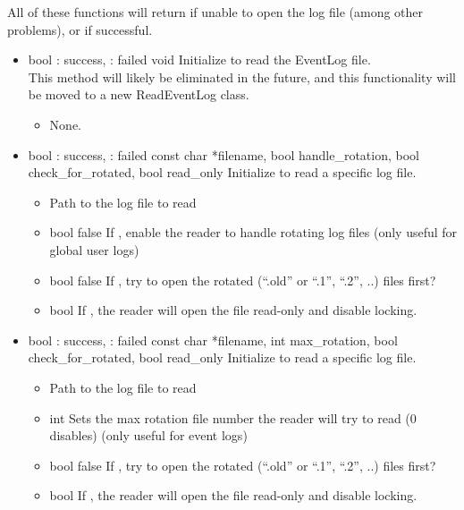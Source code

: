 All of these functions will return  if unable to open the
  log file (among other problems), or  if successful.
\begin{itemize}

\item {}
  {bool} {: success, : failed}
  {void}
  {Initialize to read the EventLog file.
  \\ \Note This method will likely be eliminated in the future, and this
  functionality will be moved to a new ReadEventLog class.}
  \begin{itemize}\item None. \end{itemize}

\item {}
  {bool} {: success, : failed}
  {const char *filename, bool handle\_rotation,
    bool check\_for\_rotated, bool read\_only}
  {Initialize to read a specific log file.}
  \begin{itemize}
  \item {}
    Path to the log file to read
  \item {} {bool} {false}
    If , enable the reader to handle rotating log files
    (only useful for global user logs)
  \item {} {bool} {false}
    If , try to open the rotated (``.old'' or ``.1'', ``.2'',
    ..) files first?
  \item {} {bool} {}
    If , the reader will open the file read-only and
    disable locking.
  \end{itemize}

\item {}
  {bool} {: success, : failed}
  {const char *filename, int max\_rotation,
    bool check\_for\_rotated, bool read\_only}
  {Initialize to read a specific log file.}
  \begin{itemize}
  \item {}
    Path to the log file to read
  \item {} {int}
    Sets the max rotation file number the reader will
    try to read (0 disables) (only useful for event logs)
  \item {} {bool} {false}
    If , try to open the rotated (``.old'' or ``.1'', ``.2'',
    ..) files first?
  \item {} {bool} {}
    If , the reader will open the file read-only and
    disable locking.
  \end{itemize}


\end{itemize}
